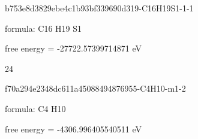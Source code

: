 \documentclass{article}
\begin{document}
\vspace{1cm}


b753e8d3829ebe4c1b93bf339690d319-C16H19S1-1-1



formula: C16 H19 S1



free energy = -27722.57399714871 eV

24

\vspace{1cm}


f70a294e2348dc611a45088494876955-C4H10-m1-2



formula: C4 H10



free energy = -4306.996405540511 eV
\end{document}
